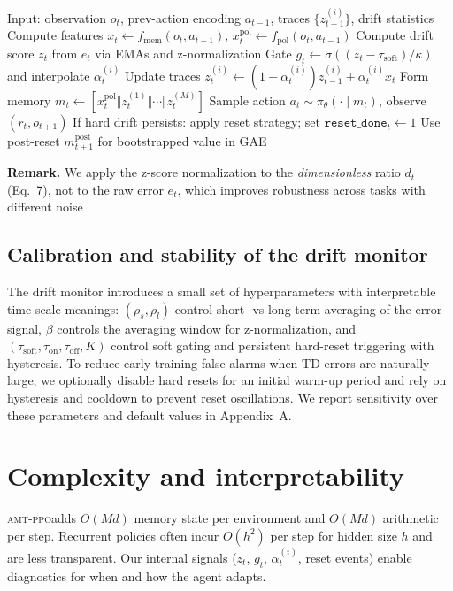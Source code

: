 \documentclass{article}
\newcommand{\AMT}{\textsc{amt-ppo}}
\begin{document}
\begin{algorithm}[t]
\caption{\AMT (one environment step)}
\label{alg:amt}
\begin{algorithmic}[1]
\State Input: observation $o_t$, prev-action encoding $a_{t-1}$, traces $\{z_{t-1}^{(i)}\}$, drift statistics
\State Compute features $x_t \leftarrow f_{\text{mem}}(o_t,a_{t-1})$, $x_t^{\text{pol}} \leftarrow f_{\text{pol}}(o_t,a_{t-1})$
\State Compute drift score $z_t$ from $e_t$ via EMAs and z-normalization
\State Gate $g_t \leftarrow \sigma((z_t-\tau_{\text{soft}})/\kappa)$ and interpolate $\alpha_t^{(i)}$
\State Update traces $z_t^{(i)} \leftarrow (1-\alpha_t^{(i)})z_{t-1}^{(i)} + \alpha_t^{(i)} x_t$
\State Form memory $m_t \leftarrow [x_t^{\text{pol}} \Vert z_t^{(1)} \Vert \cdots \Vert z_t^{(M)}]$
\State Sample action $a_t \sim \pi_\theta(\cdot\mid m_t)$, observe $(r_t,o_{t+1})$
\State If hard drift persists: apply reset strategy; set $\texttt{reset\_done}_t \leftarrow 1$
\State Use post-reset $m_{t+1}^{\text{post}}$ for bootstrapped value in GAE
\end{algorithmic}
\end{algorithm}

\noindent\textbf{Remark.} We apply the z-score normalization to the \emph{dimensionless} ratio $d_t$ (Eq.~7), not to the raw error $e_t$, which improves robustness across tasks with different noise

\subsection{Calibration and stability of the drift monitor}
\label{sec:calibration}
The drift monitor introduces a small set of hyperparameters with interpretable time-scale meanings: $(\rho_s,\rho_l)$ control short- vs long-term averaging of the error signal, $\beta$ controls the averaging window for z-normalization, and $(\tau_{\text{soft}},\tau_{\text{on}},\tau_{\text{off}},K)$ control soft gating and persistent hard-reset triggering with hysteresis. To reduce early-training false alarms when TD errors are naturally large, we optionally disable hard resets for an initial warm-up period and rely on hysteresis and cooldown to prevent reset oscillations. We report sensitivity over these parameters and default values in Appendix~A.


\section{Complexity and interpretability}
\AMT adds $O(Md)$ memory state per environment and $O(Md)$ arithmetic per step. Recurrent policies often incur $O(h^2)$ per step for hidden size $h$ and are less transparent. Our internal signals ($z_t$, $g_t$, $\alpha_t^{(i)}$, reset events) enable diagnostics for when and how the agent adapts.
\end{document}
